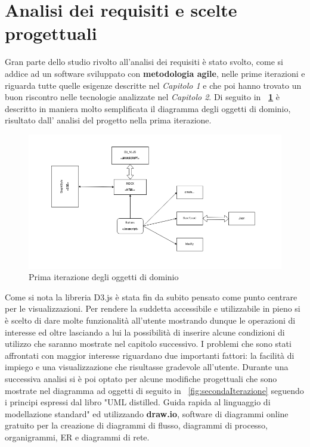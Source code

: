 {\section{Analisi dei requisiti e scelte progettuali}

Gran parte dello studio rivolto all'analisi dei requisiti \`e stato svolto, come si addice ad un software sviluppato con \textbf{metodologia agile}, nelle prime iterazioni e riguarda tutte quelle esigenze descritte nel \textit{Capitolo 1} e che poi hanno trovato un buon riscontro nelle tecnologie analizzate nel \textit{Capitolo 2}. Di seguito in \textbf{\figurename~\ref{fig:primaIterazione}}
\`e descritto in maniera molto semplificata il diagramma degli oggetti di dominio, risultato dall' analisi del progetto nella prima iterazione.
\begin{figure}[!htb]
	\begin{center}
		\hspace{-3.5 cm}
		\includegraphics[width=1.2 \linewidth]{figure/primaIterazione}
	\end{center}
	\caption{Prima iterazione degli oggetti di dominio\label{fig:primaIterazione}}
\end{figure}
Come si nota la libreria D3.js è stata fin da subito pensato come punto centrare per le visualizzazioni. Per rendere la suddetta accessibile e utilizzabile in pieno si \`e scelto di dare molte funzionalità all'utente mostrando dunque le operazioni di interesse ed oltre lasciando a lui la possibilità di inserire alcune condizioni di utilizzo che saranno mostrate nel capitolo successivo. I problemi che sono stati affrontati con maggior interesse riguardano due importanti fattori: la facilit\`a di impiego e una visualizzazione che risultasse gradevole all'utente.
Durante una successiva analisi si \`e poi optato per alcune modifiche progettuali che sono mostrate nel diagramma ad oggetti di seguito in \figurename~\ref{fig:secondaIterazione} seguendo i principi espressi dal libro "UML distilled. Guida rapida al linguaggio di modellazione standard"\cite{UML:10} ed utilizzando \textbf{draw.io}, software di diagrammi online gratuito per la creazione di diagrammi di flusso, diagrammi di processo, organigrammi, ER e diagrammi di rete.
}
